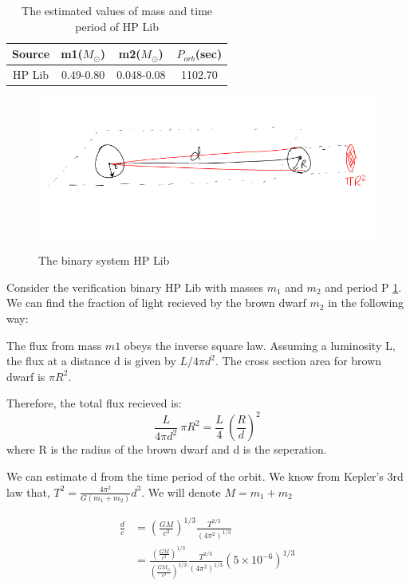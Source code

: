 \documentclass[10pt,a4paper]{article}
\begin{document}
\begin{table}[H]
\centering
\begin{tabular}{|c|c|c|c|}
\hline 
\rule[-1ex]{0pt}{2.5ex} Source & m1($M_{\odot}$) & m2($M_{\odot}$) & $P_{orb}$(sec) \\ 
\hline 
\rule[-1ex]{0pt}{2.5ex} HP Lib & 0.49-0.80 & 0.048-0.08 & 1102.70 \\ 
\hline 
\end{tabular}
\caption{The estimated values of mass and time period of HP Lib}
\end{table}

\begin{figure}[ht]
\centering
\includegraphics[scale=0.5]{diagram1.png}
\label{1}
\caption{The binary system HP Lib}
\end{figure}

Consider the verification binary HP Lib with masses $m_1$ and $m_2$ and period P \ref{1}. We can find the fraction of light recieved by the brown dwarf $m_2$ in the following way:

The flux from mass $m1$ obeys the inverse square law. Assuming a luminosity L, the flux at a distance d is given by $L/4 \pi d^2$. The cross section area for brown dwarf is $\pi R^2$.


Therefore, the total flux recieved is: $$\frac{L}{4 \pi d^2} \ \pi R^2 = \frac{L}{4} \ \left(\frac{R}{d}\right)^2 $$ where R is the radius of the brown dwarf and d is the seperation.

We can estimate d from the time period of the orbit. We know from Kepler's 3rd law that, $T^2 = \frac{4 \pi^{2}}{G (m_1 + m_2)} d^3$. We will denote $M=m_1 + m_2$

\begin{align*}
\frac{d}{c}&=\left(\frac{GM}{c^3}\right)^{1/3} \frac{T^{2/3}}{(4 \pi^{2})^{1/3}}\\
&=\frac{\left(\frac{GM}{c^3}\right)^{1/3}}{\left(\frac{GM_{\odot}}{c^3}\right)^{1/3}} \frac{T^{2/3}}{(4\pi^2)^{1/3}} (5 \times 10^{-6})^{1/3}
\end{align*}
\end{document}
